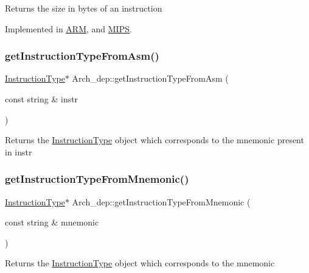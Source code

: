 Returns the size in bytes of an instruction 

Implemented in \hyperlink{classARM_a1eb1efd95035b2a16f65bb1f58916e7b}{A\+RM}, and \hyperlink{classMIPS_ad192996344511aa0152adf644cf84238}{M\+I\+PS}.

\mbox{\label{classArch__dep_ab08ac366e83b7b1f32b982849c9c3ee5}} 
\subsubsection{\texorpdfstring{get\+Instruction\+Type\+From\+Asm()}{getInstructionTypeFromAsm()}}
{\footnotesize\ttfamily \hyperlink{classInstructionType}{Instruction\+Type}$\ast$ Arch\+\_\+dep\+::get\+Instruction\+Type\+From\+Asm (\begin{DoxyParamCaption}\item[{const string \&}]{instr }\end{DoxyParamCaption})}

Returns the \hyperlink{classInstructionType}{Instruction\+Type} object which corresponds to the mnemonic present in instr \mbox{\label{classArch__dep_a842926338441fd9f65a8775450a1b811}} 
\subsubsection{\texorpdfstring{get\+Instruction\+Type\+From\+Mnemonic()}{getInstructionTypeFromMnemonic()}}
{\footnotesize\ttfamily \hyperlink{classInstructionType}{Instruction\+Type}$\ast$ Arch\+\_\+dep\+::get\+Instruction\+Type\+From\+Mnemonic (\begin{DoxyParamCaption}\item[{const string \&}]{mnemonic }\end{DoxyParamCaption})}

Returns the \hyperlink{classInstructionType}{Instruction\+Type} object which corresponds to the mnemonic \mbox{\label{classArch__dep_a78780a4581807e2974057810e6aaa6c1}} 
